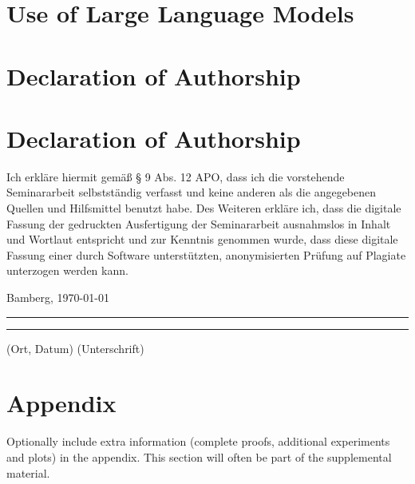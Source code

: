 \documentclass[a4paper]{article}
\begin{document}
\section*{Use of Large Language Models}



\section*{Declaration of Authorship}


{\parindent 0cm
\section*{Declaration of Authorship}
Ich erkläre hiermit gemäß § 9 Abs. 12 APO, dass ich die vorstehende Seminararbeit selbstständig verfasst und keine anderen als die angegebenen Quellen und Hilfsmittel benutzt habe. Des Weiteren erkläre ich, dass die digitale Fassung der gedruckten Ausfertigung der Seminararbeit ausnahmslos in Inhalt und Wortlaut entspricht und zur Kenntnis genommen wurde, dass diese digitale Fassung einer durch Software unterstützten, anonymisierten Prüfung auf Plagiate unterzogen werden kann.\\
\vspace{2\baselineskip}
  
Bamberg, \today

\rule[0.5em]{14em}{0.5pt} \hspace{0.25\linewidth}\rule[0.5em]{14em}{0.5pt}
\vspace{1em}
\hspace{4em} (Ort, Datum) \hspace{0.51\linewidth} (Unterschrift)
}







\appendix


\section{Appendix}


Optionally include extra information (complete proofs, additional experiments and plots) in the appendix.
This section will often be part of the supplemental material.
\end{document}
